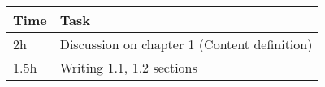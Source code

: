 \begin{center}
    {\renewcommand{\arraystretch}{2}%
    \begin{tabular}{L{2cm}L{12cm}}
        \hline
        \textbf{Time} & \textbf{Task} \\
        \hline
        2h & Discussion on chapter 1 (Content definition) \\
        \hline
        1.5h & Writing 1.1, 1.2 sections \\
        \hline
    \end{tabular}}
\end{center}